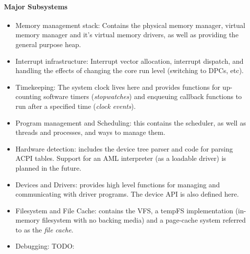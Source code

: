 \paragraph{Major Subsystems}
\begin{itemize}
    \item Memory management stack: Contains the physical memory manager, virtual memory manager and it's virtual memory drivers, as well as providing the general purpose heap.
    \item Interrupt infrastructure: Interrupt vector allocation, interrupt dispatch, and handling the effects of changing the core run level (switching to DPCs, etc).
    \item Timekeeping: The system clock lives here and provides functions for up-counting software timers (\textit{stopwatches}) and enqueuing callback functions to run after a specified time (\textit{clock events}).
    \item Program management and Scheduling: this contains the scheduler, as well as threads and processes, and ways to manage them.
    \item Hardware detection: includes the device tree parser and code for parsing ACPI tables. Support for an AML interpreter (as a loadable driver) is planned in the future.
    \item Devices and Drivers: provides high level functions for managing and communicating with driver programs. The device API is also defined here.
    \item Filesystem and File Cache: contains the VFS, a tempFS implementation (in-memory filesystem with no backing media) and a page-cache system referred to as the \textit{file cache}.
    \item Debugging: TODO:
\end{itemize}

